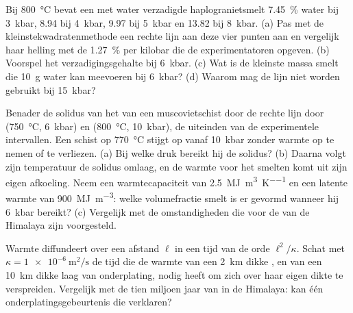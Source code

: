 \begin{exercise}[$\star\star$]\label{exo:b2:crustal-melting:9}
Bij \qty{800}{\celsius} bevat een met water verzadigde haplogranietsmelt \qty{7.45}{\percent}
water bij \qty{3}{kbar}, 8.94 bij \qty{4}{kbar}, 9.97 bij \qty{5}{kbar} en 13.82 bij
\qty{8}{kbar}. (a) Pas met de kleinstekwadratenmethode een rechte lijn aan deze vier punten aan en vergelijk
haar helling met de \qty{1.27}{\percent} per kilobar die de experimentatoren opgeven.
(b) Voorspel het verzadigingsgehalte bij \qty{6}{kbar}. (c) Wat is de kleinste massa smelt
die \qty{10}{\gram} water kan meevoeren bij \qty{6}{kbar}? (d) Waarom mag de lijn niet
worden gebruikt bij \qty{15}{kbar}?
\end{exercise}

\begin{exercise}[$\star\star\star$]\label{exo:b2:crustal-melting:10}
Benader de solidus van het  van een muscovietschist door de rechte lijn
door (\qty{750}{\celsius}, \qty{6}{kbar}) en (\qty{800}{\celsius}, \qty{10}{kbar}),
de uiteinden van de experimentele intervallen. Een schist op \qty{770}{\celsius} stijgt op vanaf
\qty{10}{kbar} zonder warmte op te nemen of te verliezen. (a) Bij welke druk bereikt hij de
solidus? (b) Daarna volgt zijn temperatuur de solidus omlaag, en de warmte voor het smelten komt
uit zijn eigen afkoeling. Neem een warmtecapaciteit van \qty{2.5}{\mega\joule\per\cubic\metre\per\kelvin}
en een latente warmte van \qty{900}{\mega\joule\per\cubic\metre}: welke volumefractie smelt
is er gevormd wanneer hij \qty{6}{kbar} bereikt? (c) Vergelijk met de omstandigheden die voor de
 van de Himalaya zijn voorgesteld.
\end{exercise}

\begin{exercise}[$\star\star\star$]\label{exo:b2:crustal-melting:11}
Warmte diffundeert over een afstand $\ell$ in een tijd van de orde $\ell^2/\kappa$. Schat met
$\kappa = \qty{1e-6}{\square\metre\per\second}$ de tijd die de warmte van een
\qty{2}{km} dikke , en van een \qty{10}{km} dikke laag van onderplating, nodig heeft om zich over haar
eigen dikte te verspreiden. Vergelijk met de tien miljoen jaar van  in de Himalaya: kan één
onderplatingsgebeurtenis die verklaren?
\end{exercise}

